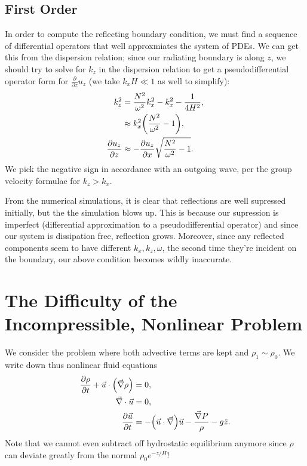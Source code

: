 \documentclass[11pt,
        usenames, %
        dvipsnames %
    ]{report}
\newcommand*{\pd}[2]{\frac{\partial#1}{\partial#2}}
\DeclarePairedDelimiter\p{\lparen}{\rparen}
\begin{document}
\subsection{First Order}

In order to compute the reflecting boundary condition, we must find a
sequence of differential operators that well approxmiates the system of PDEs. We
can get this from the dispersion relation; since our radiating boundary is along
$z$, we should try to solve for $k_z$ in the dispersion relation to get a
pseudodifferential operator form for $\pd{}{z}u_z$ (we take $k_xH \ll 1$ as well
to simplify):
\begin{align}
    k_z^2 &= \frac{N^2}{\omega^2}k_x^2 - k_x^2 - \frac{1}{4H^2},\nonumber\\
        &\approx k_x^2\p*{\frac{N^2}{\omega^2} - 1},\\
    \pd{u_z}{z} &\approx -\pd{u_z}{x}\sqrt{\frac{N^2}{\omega^2} - 1}.
\end{align}
We pick the negative sign in accordance with an outgoing wave, per the group
velocity formulae for $k_z > k_x$.

From the numerical simulations, it is clear that reflections are well supressed
initially, but the the simulation blows up. This is because our supression is
imperfect (differential approximation to a pseudodifferential operator) and
since our system is dissipation free, reflection grows. Moreover, since any
reflected components seem to have different $k_x, k_z, \omega$, the second time
they're incident on the boundary, our above condition becomes wildly inaccurate.

\section{The Difficulty of the Incompressible, Nonlinear Problem}

We consider the problem where both advective terms are kept and $\rho_1 \sim
\rho_0$. We write down thus nonlinear fluid equations
\begin{equation}
    \begin{split}
        \pd{\rho}{t} + \vec{u} \cdot \p*{\vec{\nabla}\rho} &= 0,\\
        \vec{\nabla} \cdot \vec{u} &= 0,\\
        \pd{\vec{u}}{t} &= -\p*{\vec{u} \cdot \vec{\nabla}} \vec{u}
            - \frac{\vec{\nabla}P}{\rho} - g\hat{z}.
    \end{split}\label{eq:nonlin_incomp}
\end{equation}
Note that we cannot even subtract off hydrostatic equilibrium anymore since
$\rho$ can deviate greatly from the normal $\rho_0e^{-z/H}$!
\end{document}
